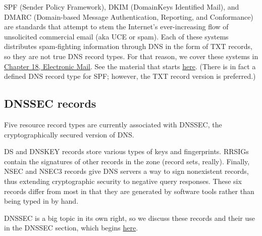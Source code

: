 SPF (Sender Policy Framework),
\protect\hypertarget{part0024_split_031.htmlux5cux23_idIndexMarker2108}{}{}DKIM
(\protect\hypertarget{part0024_split_031.htmlux5cux23_idIndexMarker2109}{}{}DomainKeys
Identified Mail), and
\protect\hypertarget{part0024_split_031.htmlux5cux23_idIndexMarker2110}{}{}DMARC
(Domain-based Message Authentication, Reporting, and Conformance) are
standards that attempt to stem the Internet's ever-increasing flow of
unsolicited commercial email (aka UCE or spam). Each of these systems
distributes spam-fighting information through DNS in the form of TXT
records, so they are not true DNS record types. For that reason, we
cover these systems in
\protect\hyperlink{part0026_split_000.htmlux5cux23_idTextAnchor1000}{Chapter
18, {Electronic Mail}}. See the material that starts
\protect\hyperlink{part0026_split_015.htmlux5cux23_idTextAnchor1022}{here}.
(There is in fact a defined DNS record type for SPF; however, the TXT
record version is preferred.)

\protect\hypertarget{part0024_split_032.html}{}{}

\hypertarget{part0024_split_032.htmlux5cux23_idContainer1069}{}
\hypertarget{part0024_split_032.htmlux5cux23calibre_pb_31}{%
\subsection[DNSSEC
records]{\texorpdfstring{\protect\hypertarget{part0024_split_032.htmlux5cux23_idTextAnchor891}{}{}\protect\hypertarget{part0024_split_032.htmlux5cux23_idIndexMarker2111}{}{}DNSSEC
records}{DNSSEC records}}\label{part0024_split_032.htmlux5cux23calibre_pb_31}}

Five resource record types are currently associated with DNSSEC, the
cryptographically secured version of DNS.

DS and DNSKEY records store various types of keys and fingerprints.
RRSIGs contain the signatures of other records in the zone (record sets,
really). Finally, NSEC and NSEC3 records give DNS servers a way to sign
nonexistent records, thus extending cryptographic security to negative
query responses. These six records differ from most in that they are
generated by software tools rather than being typed in by hand.

DNSSEC is a big topic in its own right, so we discuss these records and
their use in the DNSSEC section, which begins
\protect\hyperlink{part0024_split_059.htmlux5cux23_idTextAnchor938}{here}.




